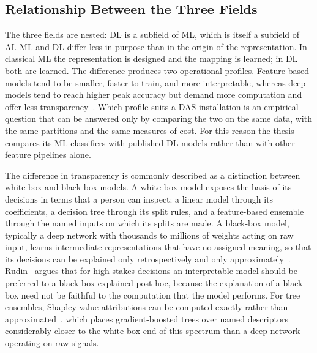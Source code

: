 \subsection{Relationship Between the Three Fields}
\label{sec:chap2AIMLDL}
The three fields are nested: DL is a subfield of ML, which is itself a subfield of AI. ML and DL differ less in purpose than in the origin of the representation. In classical ML the representation is designed and the mapping is learned; in DL both are learned. The difference produces two operational profiles. Feature-based models tend to be smaller, faster to train, and more interpretable, whereas deep models tend to reach higher peak accuracy but demand more computation and offer less transparency~\cite{shi2025benchmarking}. Which profile suits a DAS installation is an empirical question that can be answered only by comparing the two on the same data, with the same partitions and the same measures of cost. For this reason the thesis compares its ML classifiers with published DL models rather than with other feature pipelines alone.

The difference in transparency is commonly described as a distinction between white-box and black-box models. A white-box model exposes the basis of its decisions in terms that a person can inspect: a linear model through its coefficients, a decision tree through its split rules, and a feature-based ensemble through the named inputs on which its splits are made. A black-box model, typically a deep network with thousands to millions of weights acting on raw input, learns intermediate representations that have no assigned meaning, so that its decisions can be explained only retrospectively and only approximately~\cite{guidotti2018survey}. Rudin~\cite{rudin2019stop} argues that for high-stakes decisions an interpretable model should be preferred to a black box explained post hoc, because the explanation of a black box need not be faithful to the computation that the model performs. For tree ensembles, Shapley-value attributions can be computed exactly rather than approximated~\cite{lundberg2020trees}, which places gradient-boosted trees over named descriptors considerably closer to the white-box end of this spectrum than a deep network operating on raw signals.

